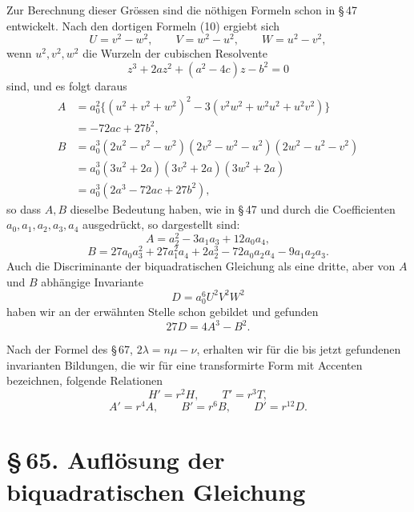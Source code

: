 \documentclass[11pt]{article}
\newcommand{\sect}[2]{\section*{\S\,#1. #2}}
\begin{document}
Zur Berechnung dieser Grössen sind die nöthigen Formeln schon in \S\,47 entwickelt. Nach den dortigen Formeln (10) ergiebt sich
\[
 U=v^2-w^2,
 \qquad V=w^2-u^2,
 \qquad W=u^2-v^2,
\]
wenn $u^2,v^2,w^2$ die Wurzeln der cubischen Resolvente
\[
 z^3+2az^2+(a^2-4c)z-b^2=0
\]
sind, und es folgt daraus
\[
\begin{aligned}
 A&=a_0^2\{(u^2+v^2+w^2)^2-3(v^2w^2+w^2u^2+u^2v^2)\}\\
  &=-72ac+27b^2,\\[0.4em]
 B&=a_0^3(2u^2-v^2-w^2)(2v^2-w^2-u^2)(2w^2-u^2-v^2)\\
  &=a_0^3(3u^2+2a)(3v^2+2a)(3w^2+2a)\\
  &=a_0^3(2a^3-72ac+27b^2),
\end{aligned}
\]
so dass $A,B$ dieselbe Bedeutung haben, wie in \S\,47 und durch die Coefficienten $a_0,a_1,a_2,a_3,a_4$ ausgedrückt, so dargestellt sind:
\begin{equation}
 A=a_2^2-3a_1a_3+12a_0a_4,
\tag{8}
\end{equation}
\begin{equation}
 B=27a_0a_3^2+27a_1^2a_4+2a_2^3-72a_0a_2a_4-9a_1a_2a_3.
\tag{9}
\end{equation}
Auch die Discriminante der biquadratischen Gleichung als eine dritte, aber von $A$ und $B$ abhängige Invariante
\begin{equation}
 D=a_0^6U^2V^2W^2
\tag{10}
\end{equation}
haben wir an der erwähnten Stelle schon gebildet und gefunden
\begin{equation}
 27D=4A^3-B^2.
\tag{11}
\end{equation}

Nach der Formel des \S\,67, $2\lambda=n\mu-\nu$, erhalten wir für die bis jetzt gefundenen invarianten Bildungen, die wir für eine transformirte Form mit Accenten bezeichnen, folgende Relationen
\begin{equation}
 H'=r^2H,
 \qquad T'=r^3T,
\tag{12a}
\end{equation}
\begin{equation}
 A'=r^4A,
 \qquad B'=r^6B,
 \qquad D'=r^{12}D.
\tag{12b}
\end{equation}

\sect{65}{Auflösung der biquadratischen Gleichung}
\end{document}
